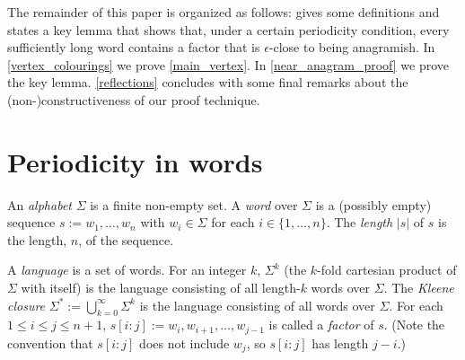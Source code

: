 \documentclass{patmorin}
\begin{document}
%
%



The remainder of this paper is organized as follows:  gives some definitions and states a key lemma that shows that, under a certain periodicity condition, every sufficiently long word contains a factor that is $\epsilon$-close to being anagramish.
In \cref{vertex_colourings} we prove \cref{main_vertex}.  In \cref{near_anagram_proof} we prove the key lemma. \cref{reflections} concludes with some final remarks about the (non-)constructiveness of our proof technique.

\section{Periodicity in words}
\label{near_anagram_statement}

An \emph{alphabet} $\Sigma$ is a finite non-empty set.  A \emph{word} over $\Sigma$ is a (possibly empty) sequence $s:=w_1,\ldots,w_n$ with $w_i\in\Sigma$ for each $i\in\{1,\ldots,n\}$. The \emph{length} $|s|$ of $s$ is the length, $n$, of the sequence.

A \emph{language} is a set of words.  For an integer $k$, $\Sigma^k$ (the $k$-fold cartesian product of $\Sigma$ with itself) is the language consisting of all length-$k$ words over $\Sigma$.  The \emph{Kleene closure} $\Sigma^*:=\bigcup_{k=0}^\infty \Sigma^k$ is the language consisting of all words over $\Sigma$.  For each $1 \le i \le j\le n+1$, $s[i\mathbin{:}j]:=w_i,w_{i+1},\ldots,w_{j-1}$ is called a \emph{factor} of $s$. (Note the convention that $s[i\mathbin{:}j]$ does not include $w_j$, so $s[i\mathbin{:}j]$ has length $j-i$.)
\end{document}
